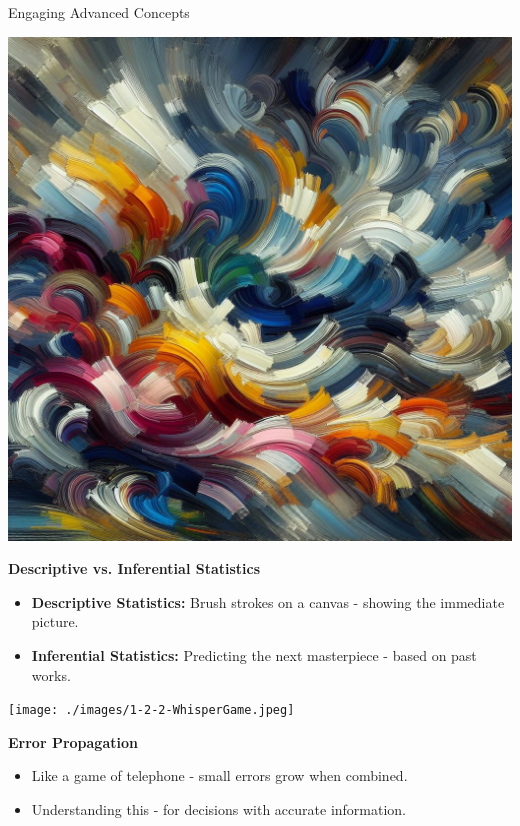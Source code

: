 \documentclass[final]{beamer}
\begin{document}
\begin{frame}[t]{}
\begin{columns}[t]
\begin{column}{.3\textwidth}
\begin{block}{Engaging Advanced Concepts}
				\begin{minipage}{0.28\textwidth}
					\centering
					\includegraphics[width=\linewidth]{./images/1-2-1-BrushOnCanvas.jpeg}
				\end{minipage}
				\hfill
				\begin{minipage}{0.7\textwidth}
					\textbf{Descriptive vs. Inferential Statistics}
					\begin{itemize}
						\item \textbf{Descriptive Statistics:} Brush strokes on a canvas - showing the immediate picture.
						\item \textbf{Inferential Statistics:} Predicting the next masterpiece - based on past works.
					\end{itemize}
				\end{minipage}

				\vspace{2.5cm}

				\begin{minipage}{0.28\textwidth}
					\centering
					\texttt{[image: ./images/1-2-2-WhisperGame.jpeg]} 
				\end{minipage}
				\hfill
				\begin{minipage}{0.7\textwidth}
					\textbf{Error Propagation}
					\begin{itemize}
						\item Like a game of telephone - small errors grow when combined.
						\item Understanding this - for decisions with accurate information.
					\end{itemize}
				\end{minipage}


\end{block}
\end{column}
\end{columns}
\end{frame}
\end{document}

